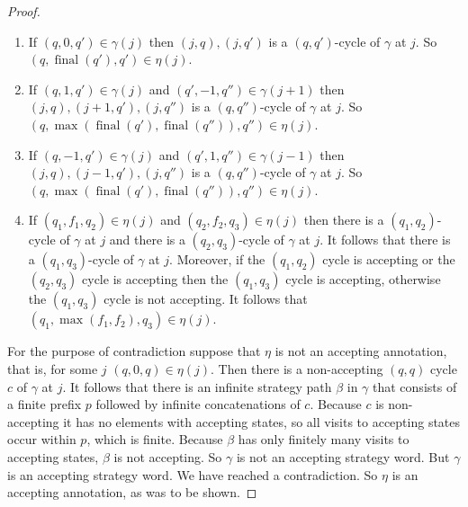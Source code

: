 \documentclass{lmcs}
\theoremstyle{definition}
\DeclareMathOperator{\?}{?}
\DeclareMathOperator{\final}{final}
\begin{document}
\begin{proof}
\begin{enumerate}
\item
If $(q,0,q') \in \gamma(j)$ then $(j,q),(j,q')$ is a $(q,q')$-cycle of $\gamma$ at $j$. So $(q,\final(q'),q') \in \eta(j)$.
\item
If $(q,1,q') \in \gamma(j)$ and $(q',-1,q'') \in \gamma(j+1)$ then $(j,q),(j+1,q'),(j,q'')$ is a $(q,q'')$-cycle of $\gamma$ at $j$. So $(q,\max(\final(q'),\final(q'')),q'') \in \eta(j)$.
\item
If $(q,-1,q') \in \gamma(j)$ and $(q',1,q'') \in \gamma(j-1)$ then $(j,q),(j-1,q'),(j,q'')$ is a $(q,q'')$-cycle of $\gamma$ at $j$. So $(q,\max(\final(q'),\final(q'')),q'') \in \eta(j)$.
\item
If $(q_1,f_1,q_2) \in \eta(j)$ and $(q_2,f_2,q_3) \in \eta(j)$ then there is a $(q_1,q_2)$-cycle of $\gamma$ at $j$ and there is a $(q_2,q_3)$-cycle of $\gamma$ at $j$. It follows that there is a $(q_1,q_3)$-cycle of $\gamma$ at $j$. Moreover, if the $(q_1,q_2)$ cycle is accepting or the $(q_2,q_3)$ cycle is accepting then the $(q_1,q_3)$ cycle is accepting, otherwise the $(q_1,q_3)$ cycle is not accepting. It follows that $(q_1,\max(f_1,f_2),q_3) \in \eta(j)$.
\end{enumerate}

For the purpose of contradiction suppose that $\eta$ is not an accepting annotation, that is, for some $j$ $(q,0,q) \in \eta(j)$. Then there is a non-accepting $(q,q)$ cycle $c$ of $\gamma$ at $j$. It follows that there is an infinite strategy path $\beta$ in $\gamma$ that consists of a finite prefix $p$ followed by infinite concatenations of $c$. Because $c$ is non-accepting it has no elements with accepting states, so all visits to accepting states occur within $p$, which is finite. Because $\beta$ has only finitely many visits to accepting states, $\beta$ is not accepting. So $\gamma$ is not an accepting strategy word. But $\gamma$ is an accepting strategy word. We have reached a contradiction. So $\eta$ is an accepting annotation, as was to be shown.
\end{proof}
\end{document}
